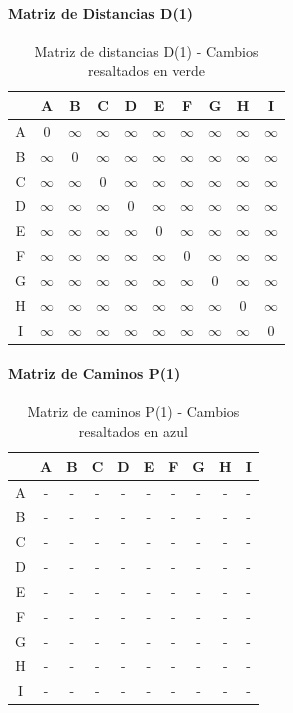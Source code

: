 \documentclass[12pt]{article}
\begin{document}
\paragraph{Matriz de Distancias D(1)}
\begin{table}[h!]
\centering
\begin{tabular}{|c|c|c|c|c|c|c|c|c|c|}
\hline
 & A & B & C & D & E & F & G & H & I \\\hline
A & 0 & $\infty$ & $\infty$ & $\infty$ & $\infty$ & $\infty$ & $\infty$ & $\infty$ & $\infty$ \\\hline
B & $\infty$ & 0 & $\infty$ & $\infty$ & $\infty$ & $\infty$ & $\infty$ & $\infty$ & $\infty$ \\\hline
C & $\infty$ & $\infty$ & 0 & $\infty$ & $\infty$ & $\infty$ & $\infty$ & $\infty$ & $\infty$ \\\hline
D & $\infty$ & $\infty$ & $\infty$ & 0 & $\infty$ & $\infty$ & $\infty$ & $\infty$ & $\infty$ \\\hline
E & $\infty$ & $\infty$ & $\infty$ & $\infty$ & 0 & $\infty$ & $\infty$ & $\infty$ & $\infty$ \\\hline
F & $\infty$ & $\infty$ & $\infty$ & $\infty$ & $\infty$ & 0 & $\infty$ & $\infty$ & $\infty$ \\\hline
G & $\infty$ & $\infty$ & $\infty$ & $\infty$ & $\infty$ & $\infty$ & 0 & $\infty$ & $\infty$ \\\hline
H & $\infty$ & $\infty$ & $\infty$ & $\infty$ & $\infty$ & $\infty$ & $\infty$ & 0 & $\infty$ \\\hline
I & $\infty$ & $\infty$ & $\infty$ & $\infty$ & $\infty$ & $\infty$ & $\infty$ & $\infty$ & 0 \\\hline
\end{tabular}
\caption{Matriz de distancias D(1) - Cambios resaltados en verde}
\end{table}

\paragraph{Matriz de Caminos P(1)}
\begin{table}[h!]
\centering
\begin{tabular}{|c|c|c|c|c|c|c|c|c|c|}
\hline
 & A & B & C & D & E & F & G & H & I \\\hline
A & - & - & - & - & - & - & - & - & - \\\hline
B & - & - & - & - & - & - & - & - & - \\\hline
C & - & - & - & - & - & - & - & - & - \\\hline
D & - & - & - & - & - & - & - & - & - \\\hline
E & - & - & - & - & - & - & - & - & - \\\hline
F & - & - & - & - & - & - & - & - & - \\\hline
G & - & - & - & - & - & - & - & - & - \\\hline
H & - & - & - & - & - & - & - & - & - \\\hline
I & - & - & - & - & - & - & - & - & - \\\hline
\end{tabular}
\caption{Matriz de caminos P(1) - Cambios resaltados en azul}
\end{table}
\end{document}
